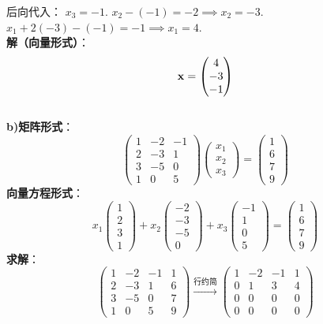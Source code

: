 \begin{exer}
后向代入：
$x_3 = -1$.
$x_2 - (-1) = -2 \implies x_2 = -3$.
$x_1 + 2(-3) - (-1) = -1 \implies x_1 = 4$.
\\
\textbf{解（向量形式）}：
$$ \mathbf{x} = \begin{pmatrix} 4 \\ -3 \\ -1 \end{pmatrix} $$
\\
\textbf{b)}\textbf{矩阵形式}：
$$ \begin{pmatrix} 1 & -2 & -1 \\ 2 & -3 & 1 \\ 3 & -5 & 0 \\ 1 & 0 & 5 \end{pmatrix} \begin{pmatrix} x_1 \\ x_2 \\ x_3 \end{pmatrix} = \begin{pmatrix} 1 \\ 6 \\ 7 \\ 9 \end{pmatrix} $$
\textbf{向量方程形式}：
$$ x_1 \begin{pmatrix} 1 \\ 2 \\ 3 \\ 1 \end{pmatrix} + x_2 \begin{pmatrix} -2 \\ -3 \\ -5 \\ 0 \end{pmatrix} + x_3 \begin{pmatrix} -1 \\ 1 \\ 0 \\ 5 \end{pmatrix} = \begin{pmatrix} 1 \\ 6 \\ 7 \\ 9 \end{pmatrix} $$
\textbf{求解}：
$$ \left(\begin{array}{ccc|c} 1 & -2 & -1 & 1 \\ 2 & -3 & 1 & 6 \\ 3 & -5 & 0 & 7 \\ 1 & 0 & 5 & 9 \end{array}\right) \xrightarrow{\text{行约简}} \left(\begin{array}{ccc|c} 1 & -2 & -1 & 1 \\ 0 & 1 & 3 & 4 \\ 0 & 0 & 0 & 0 \\ 0 & 0 & 0 & 0 \end{array}\right) $$

\end{exer}
